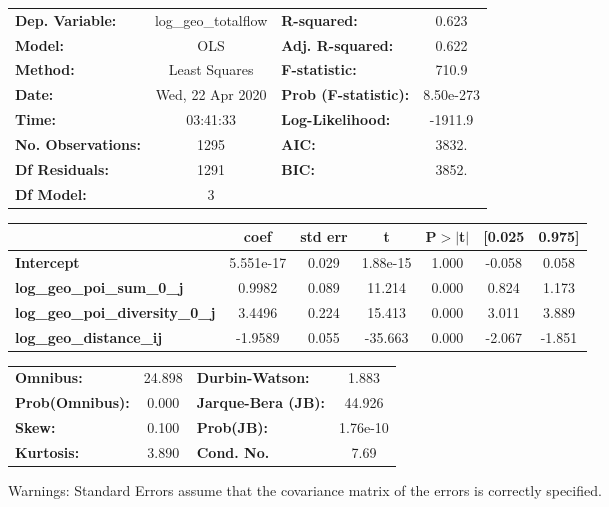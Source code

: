 \begin{center}
\begin{tabular}{lclc}
\toprule
\textbf{Dep. Variable:}                 & log\_geo\_totalflow & \textbf{  R-squared:         } &     0.623   \\
\textbf{Model:}                         &         OLS         & \textbf{  Adj. R-squared:    } &     0.622   \\
\textbf{Method:}                        &    Least Squares    & \textbf{  F-statistic:       } &     710.9   \\
\textbf{Date:}                          &   Wed, 22 Apr 2020  & \textbf{  Prob (F-statistic):} & 8.50e-273   \\
\textbf{Time:}                          &       03:41:33      & \textbf{  Log-Likelihood:    } &   -1911.9   \\
\textbf{No. Observations:}              &          1295       & \textbf{  AIC:               } &     3832.   \\
\textbf{Df Residuals:}                  &          1291       & \textbf{  BIC:               } &     3852.   \\
\textbf{Df Model:}                      &             3       & \textbf{                     } &             \\
\bottomrule
\end{tabular}
\begin{tabular}{lcccccc}
                                        & \textbf{coef} & \textbf{std err} & \textbf{t} & \textbf{P$> |$t$|$} & \textbf{[0.025} & \textbf{0.975]}  \\
\midrule
\textbf{Intercept}                      &    5.551e-17  &        0.029     &  1.88e-15  &         1.000        &       -0.058    &        0.058     \\
\textbf{log\_geo\_poi\_sum\_0\_j}       &       0.9982  &        0.089     &    11.214  &         0.000        &        0.824    &        1.173     \\
\textbf{log\_geo\_poi\_diversity\_0\_j} &       3.4496  &        0.224     &    15.413  &         0.000        &        3.011    &        3.889     \\
\textbf{log\_geo\_distance\_ij}         &      -1.9589  &        0.055     &   -35.663  &         0.000        &       -2.067    &       -1.851     \\
\bottomrule
\end{tabular}
\begin{tabular}{lclc}
\textbf{Omnibus:}       & 24.898 & \textbf{  Durbin-Watson:     } &    1.883  \\
\textbf{Prob(Omnibus):} &  0.000 & \textbf{  Jarque-Bera (JB):  } &   44.926  \\
\textbf{Skew:}          &  0.100 & \textbf{  Prob(JB):          } & 1.76e-10  \\
\textbf{Kurtosis:}      &  3.890 & \textbf{  Cond. No.          } &     7.69  \\
\bottomrule
\end{tabular}
\end{center}

Warnings: \newline
 [1] Standard Errors assume that the covariance matrix of the errors is correctly specified.